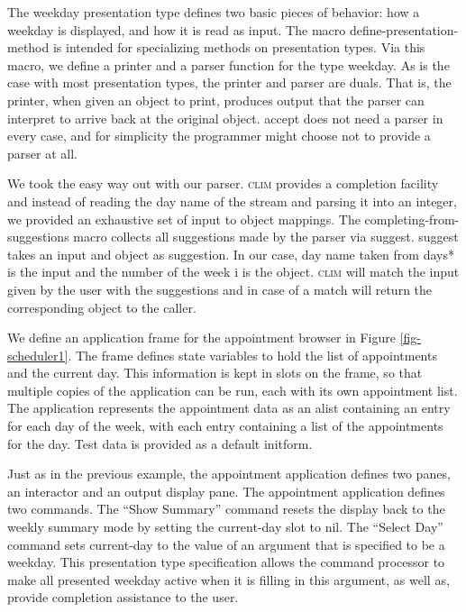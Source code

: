 \documentclass[twocolumn,a4paper]{article}
\newcommand {\code}[1]{{\sffamily #1}}
\newcommand {\CLIM}{\textsc{clim}}
\let\constant\code
\let\variable\code
\let\macro\code
\begin{document}
\begin{figure*}
\lstset{style=framestyle}

\caption{Scheduler: application frame, presentation type and commands}\label{fig-scheduler1}
\end{figure*}
\begin{figure*}
\lstset{style=framestyle}

\caption{Scheduler: display functions}\label{fig-scheduler2}
\end{figure*}

The weekday presentation type defines two basic pieces of behavior:
how a weekday is displayed, and how it is read as input. The macro
\macro{define-presentation-method} is intended for specializing
methods on presentation types.  Via this macro, we define a printer
and a parser function for the type \code{weekday}. As is the case with
most presentation types, the printer and parser are duals. That is,
the printer, when given an object to print, produces output that the
parser can interpret to arrive back at the original object.
\code{accept} does not need a parser in every case, and for simplicity
the programmer might choose not to provide a parser at all.

We took the easy way out with our parser. \CLIM{} provides a
completion facility and instead of reading the day name of the stream
and parsing it into an integer, we provided an exhaustive set of input
to object mappings. The \macro{completing-from-suggestions} macro
collects all suggestions made by the parser via
\code{suggest}. \code{suggest} takes an input and object as
suggestion. In our case, day name taken from \variable{*days*} is the
input and the number of the week \variable{i} is the object. \CLIM{}
will match the input given by the user with the suggestions and in
case of a match will return the corresponding object to the caller.

We define an application frame for the appointment browser in Figure
\ref{fig-scheduler1}. The frame defines state variables to hold the
list of appointments and the current day. This information is kept in
slots on the frame, so that multiple copies of the application can be
run, each with its own appointment list. The application represents
the appointment data as an alist containing an entry for each day of
the week, with each entry containing a list of the appointments for
the day. Test data is provided as a default initform.

Just as in the previous example, the appointment application defines
two panes, an interactor and an output display pane. The appointment
application defines two commands. The ``Show Summary'' command resets
the display back to the weekly summary mode by setting the
\variable{current-day} slot to \constant{nil}. The ``Select Day''
command sets \variable{current-day} to the value of an argument that
is specified to be a weekday. This presentation type specification
allows the command processor to make all presented weekday active when
it is filling in this argument, as well as, provide completion
assistance to the user.
\end{document}
